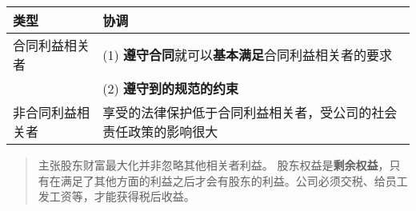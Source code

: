 \documentclass[12pt,a4paper]{article}
\begin{document}
\begin{center}
\begin{tabular}{ll}
类型 & 协调\\
\hline
合同利益相关者 & (1) \textbf{遵守合同}就可以\textbf{基本满足}合同利益相关者的要求\\
 & (2) \textbf{遵守到的规范的约束}\\
\hline
非合同利益相关者 & 享受的法律保护低于合同利益相关者，受公司的社会责任政策的影响很大\\
\end{tabular}
\end{center}
\begin{quote}
主张股东财富最大化并非忽略其他相关者利益。
股东权益是\textbf{剩余权益}，只有在满足了其他方面的利益之后才会有股东的利益。公司必须交税、给员工发工资等，才能获得税后收益。
\end{quote}
\end{document}
